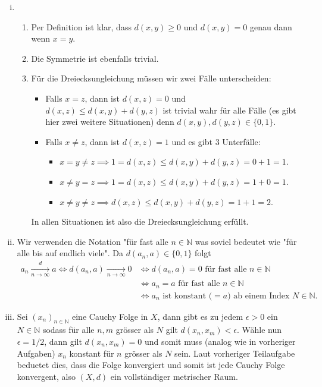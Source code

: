 \documentclass[a4paper, 20]{exam}
\begin{document}
\begin{solution}
\begin{enumerate}[i)]
\item 
\begin{enumerate}
\item Per Definition ist klar, dass $d(x,y) \geq 0$ und $d(x,y)=0$ genau dann wenn $x=y$.
\item Die Symmetrie ist ebenfalls trivial.
\item Für die Dreiecksungleichung müssen wir zwei Fälle unterscheiden: 
\begin{itemize}
\item Falls $x=z$, dann ist $d(x,z)=0$ und $d(x,z) \leq d(x,y)+d(y,z)$ ist trivial wahr für alle Fälle (es gibt hier zwei weitere Situationen) denn $d(x,y),d(y,z) \in \{0,1\}$.
\item Falls $x \neq z$, dann ist $d(x,z)=1$ und es gibt 3 Unterfälle:
\begin{itemize}
\item $x=y \neq z \implies 1=d(x,z) \leq d(x,y)+d(y,z) = 0+1=1$.
\item $x \neq y=z \implies 1=d(x,z) \leq d(x,y)+d(y,z) = 1+0 =1$.
\item $x \neq y \neq z \implies d(x,z) \leq d(x,y)+ d(y,z) = 1+1=2$. 
\end{itemize} 
\end{itemize}
In allen Situationen ist also die Dreiecksungleichung erfüllt. 
\end{enumerate}
\item Wir verwenden die Notation "für fast alle $n \in \mathbb{N}$ was soviel bedeutet wie "für alle bis auf endlich viele". Da $d(a_n,a) \in \{0,1\}$ folgt 
\begin{align*}
a_n \xrightarrow[n \to \infty]{d} a  \iff d(a_n,a) \xrightarrow[n\to \infty]{} 0 &\iff d(a_n,a)=0 \text{ für fast alle } n \in \mathbb{N} \\
& \iff a_n = a \text{ für fast alle }n \in \mathbb{N} \\
& \iff a_n \text{ ist konstant ($=a$) ab einem Index } N \in \mathbb{N}.
\end{align*}
\item Sei $(x_n)_{n \in \mathbb{N}}$ eine Cauchy Folge in $X$, dann gibt es zu jedem $\epsilon >0$ ein $N \in \mathbb{N}$ sodass für alle $n,m$ grösser als $N$ gilt $d(x_n,x_m) < \epsilon$. Wähle nun $\epsilon=1/2$, dann gilt $d(x_n,x_m)=0$ und somit muss (analog wie in vorheriger Aufgaben) $x_n$ konstant für $n$ grösser als $N$ sein. Laut vorheriger Teilaufgabe beduetet dies, dass die Folge konvergiert und somit ist jede Cauchy Folge konvergent, also $(X,d)$ ein vollständiger metrischer Raum. 

\end{enumerate}
\end{solution}
\end{document}
